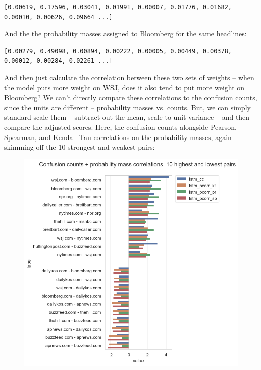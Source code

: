 \documentclass{scrartcl}
\begin{document}
\begin{lstlisting}
[0.00619, 0.17596, 0.03041, 0.01991, 0.00007, 0.01776, 0.01682, 0.00010, 0.00626, 0.09664 ...]
\end{lstlisting}

And the the probability masses assigned to Bloomberg for the same headlines:

\begin{lstlisting}
[0.00279, 0.49098, 0.00894, 0.00222, 0.00005, 0.00449, 0.00378, 0.00012, 0.00284, 0.02261 ...]
\end{lstlisting}

And then just calculate the correlation between these two sets of weights -- when the model puts more weight on WSJ, does it also tend to put more weight on Bloomberg? We can't directly compare these correlations to the confusion counts, since the units are different -- probability masses vs. counts. But, we can simply standard-scale them -- subtract out the mean, scale to unit variance -- and then compare the adjusted scores. Here, the confusion counts alongside Pearson, Spearman, and Kendall-Tau correlations on the probability masses, again skimming off the 10 strongest and weakest pairs:

\begin{figure}[H]
  \centering
  \includegraphics[height=0.4\textheight]{figures/hlg-cc-pcorr-tb10.png}
\end{figure}
\end{document}
